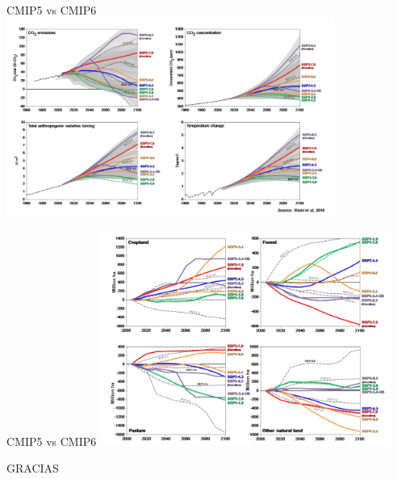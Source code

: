 \documentclass{beamer}
\begin{document}
\begin{frame}{CMIP5 vs CMIP6}
\includegraphics[height=6.5cm]{img/cmip5y6v2.png}
\centering
\end{frame}	

\begin{frame}{CMIP5 vs CMIP6}
\includegraphics[height=7cm]{img/cmip5y6v3.png}
\centering
\end{frame}	

\begin{frame}
\huge{\centerline{GRACIAS}}
\end{frame}
\end{document}
